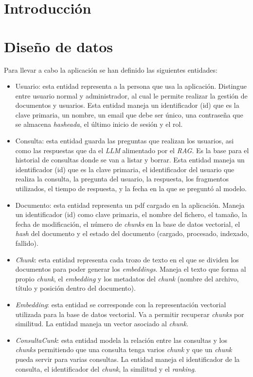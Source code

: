 
\section{Introducción}

\section{Diseño de datos}

Para llevar a cabo la aplicación se han definido las siguientes entidades:
\begin{itemize}
\tightlist
	\item Usuario: esta entidad representa a la persona que usa la aplicación. Distingue entre usuario normal y administrador, al cual le permite realizar la gestión de documentos y usuarios. Esta entidad maneja un identificador (id) que es la clave primaria, un nombre, un email que debe ser único, una contraseña que se almacena \textit{hasheada}, el último inicio de sesión y el rol.
	\item Consulta: esta entidad guarda las preguntas que realizan los usuarios, asi como las respuestas que da el \textit{LLM} alimentado por el \textit{RAG}. Es la base para el historial de consultas donde se van a listar y borrar. Esta entidad maneja un identificador (id) que es la clave primaria, el identificador del usuario que realiza la consulta, la pregunta del usuario, la respuesta, los fragmentos utilizados, el tiempo de respuesta, y la fecha en la que se preguntó al modelo.
	\item Documento: esta entidad representa un pdf cargado en la aplicación. Maneja un identificador (id) como clave primaria, el nombre del fichero, el tamaño, la fecha de modificación, el número de \textit{chunks} en la base de datos vectorial, el \textit{hash} del documento y el estado del documento (cargado, procesado, indexado, fallido). 
	\item \textit{Chunk}: esta entidad representa cada trozo de texto en el que se dividen los documentos para poder generar los \textit{embeddings}. Maneja el texto que forma al propio \textit{chunk}, el \textit{embedding} y los metadatos del \textit{chunk} (nombre del archivo, título y posición dentro del documento).
	\item \textit{Embedding}: esta entidad se corresponde con la representación vectorial utilizada para la base de datos vectorial. Va a permitir recuperar \textit{chunks} por similitud. La entidad maneja un vector asociado al \textit{chunk}.
	\item \textit{ConsultaCunk}: esta entidad modela la relación entre las consultas y los \textit{chunks} permitiendo que una consulta tenga varios \textit{chunk} y que un \textit{chunk} pueda servir para varias consultas. La entidad maneja el identificador de la consulta, el identificador del \textit{chunk}, la similitud y el \textit{ranking}.
\end{itemize}

